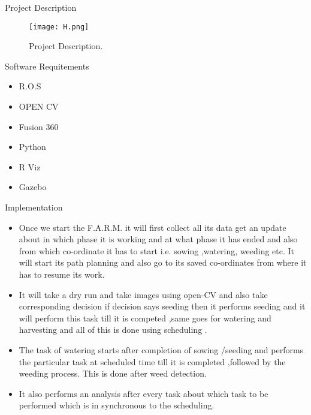 \documentclass[10pt]{beamer}
\begin{document}

\begin{frame}[t]{Project Description}\label{s2}
\begin{figure}
\texttt{[image: H.png]}
\caption{Project Description.}
\label{fig:mriimage21}
\end{figure} 


\end{frame}


\begin{frame}[t]{Software Requitements}\label{s2}
\begin{itemize}



\item   R.O.S
\item     OPEN CV                                                                                   
\item     Fusion 360
\item      Python
\item      R Viz
\item      Gazebo








\end{itemize}
\end{frame}


\begin{frame}[t]{Implementation}\label{s2}
\begin{itemize}
\item{Once we start the F.A.R.M. it will first collect all its data get an update about in which phase it is working and at what phase it has ended and also from which co-ordinate it has to start i.e. sowing ,watering, weeding etc. It will start its path planning and also go to its saved co-ordinates from where it has to resume its work.
	}
\item{It will take a dry run and take images using open-CV and also take corresponding decision if decision says seeding then it performs seeding and it will perform this task till it is competed ,same goes for watering and harvesting and all of this is done using scheduling .
	}
\item{The task of watering starts after completion of sowing /seeding and performs the particular task at scheduled time till it is completed ,followed by the weeding process. This is done after weed detection.
	}
\item{ It also performs an analysis after every task about which task to be performed which is in synchronous to the scheduling. }

\end{itemize}
\end{frame}
\end{document}
